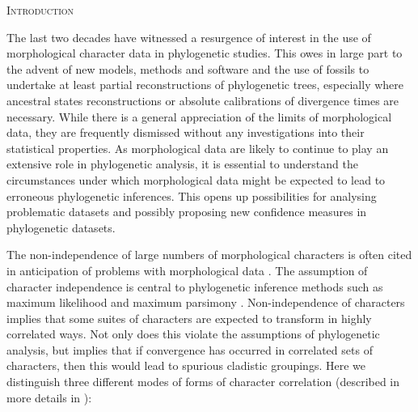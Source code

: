 \documentclass[12pt,letterpaper]{article}
\renewcommand{\section}[1]{%
\bigskip
\begin{center}
\begin{Large}
\normalfont\scshape #1
\medskip
\end{Large}
\end{center}}
\begin{document}
\section{Introduction}
The last two decades have witnessed a resurgence of interest in the use of morphological character data in phylogenetic studies.
This owes in large part to the advent of new models, methods and software \citep{lewisa2001,ronquista2012,Ronquist2012mrbayes,heath2014fossilized} and the use of fossils to undertake at least partial reconstructions of phylogenetic trees, especially where ancestral states reconstructions or absolute calibrations of divergence times are necessary.
While there is a general appreciation of the limits of morphological data, they are frequently dismissed without any investigations into their statistical properties. %
As morphological data are likely to continue to play an extensive role in phylogenetic analysis,  %
it is essential to understand the circumstances under which morphological data might be expected to lead to erroneous phylogenetic inferences.
This opens up possibilities for analysing problematic datasets and possibly proposing new confidence measures in phylogenetic datasets.

The non-independence of large numbers of morphological characters is often cited in anticipation of problems with morphological data \cite[e.g.][]{Davalos01072014, ZouConvergence}.
The assumption of character independence is central to phylogenetic inference methods such as maximum likelihood and maximum parsimony \citep[e.g.][]{joysey1982problems,felsenstein1985phylogenies,lewisa2001,felsenstein2004inferring}.
Non-independence of characters implies that some suites of characters are expected to transform in highly correlated ways.
Not only does this violate the assumptions of phylogenetic analysis, but implies that if convergence has occurred in correlated sets of characters, then this would lead to spurious cladistic groupings.
Here we distinguish three different modes of forms of character correlation (described in more details in \citealt{wilkison1992ordered,wilkinson1995character,wilkinson1995coping}):
\end{document}
